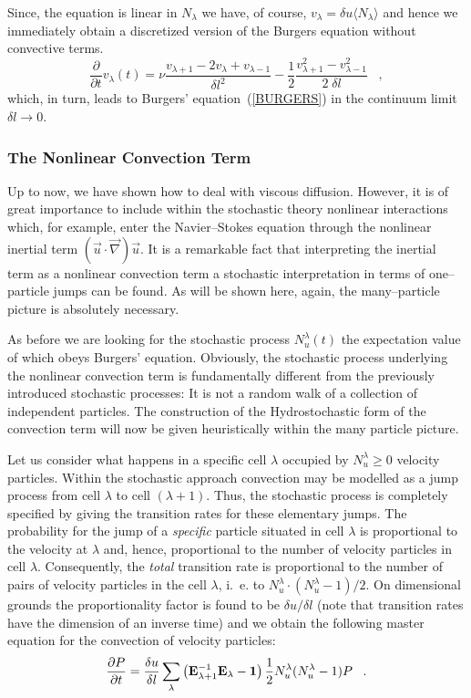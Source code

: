 Since, the equation is linear in $N_{\lambda}$ we have, of course,
$v_{\lambda} = \delta u \langle N_{\lambda} \rangle$ and hence
we immediately obtain a discretized version of the Burgers equation without
convective terms. 
\begin{equation}
\label{DISCRETEBURGERS}
\frac{\partial}{\partial t} v_{\lambda}(t) =
\nu \frac{v_{\lambda +1} -2 v_{\lambda} +
v_{\lambda -1}}{\delta l^2}
- \frac{1}{2} \frac{v_{\lambda+1}^2 -
v_{\lambda -1}^2}{2 \; \delta l }
\;\;\; ,
\end{equation}
which, in turn, leads to Burgers' equation~(\ref{BURGERS}) in the
continuum limit $\delta l \longrightarrow 0$.

\subsubsection{The Nonlinear Convection Term}
Up to now, we have shown how to deal with  viscous diffusion. 
However, it is of great importance
to include
within the stochastic theory nonlinear interactions which, for
example, enter
the Navier--Stokes equation through the nonlinear inertial term
$(\vec{u} \cdot \vec{\nabla}) \vec{u}$. It is a remarkable fact
that interpreting
the inertial term as a nonlinear convection term a
stochastic interpretation
in terms of one--particle jumps can be found. As will be shown
here, again,
the many--particle picture is absolutely necessary.

As before we are looking for the stochastic process
$N_u^{\lambda}(t)$
the expectation value of which obeys Burgers' equation. Obviously,
the
stochastic process underlying the
nonlinear convection term is fundamentally different from the
previously
introduced stochastic processes: It is not a random walk of
a collection
of independent particles.
The construction of the Hydrostochastic form of the
convection term will now be given heuristically
within the many particle picture.
 

Let us consider what happens in a specific cell $\lambda$ occupied
by
$N_u^{\lambda} \geq 0$ velocity particles. Within the stochastic
approach
convection may be modelled as a jump process from cell
$\lambda$ to cell $(\lambda + 1)$.
Thus, the stochastic process is
completely specified by giving the transition rates for
these elementary jumps. The probability for the jump of a
{\em{specific}} particle situated in cell $\lambda$ is proportional
to the velocity at $\lambda$ and, hence, proportional to the
number of velocity particles in cell $\lambda$.
Consequently, the
{\em total} transition rate is proportional to the number of pairs
of velocity particles in the cell $\lambda$, i.~e. to
$N_u^{\lambda} \cdot
(N_u^{\lambda} - 1) / 2$. On dimensional grounds the
proportionality factor
is found to be $\delta u / \delta l$ (note that transition rates
have
the dimension of an inverse time) and we obtain the following master
equation for the convection of velocity particles:
\begin{equation}
\frac{\partial P}{\partial t}  = 
\frac{\delta u}{\delta l} \sum_{\lambda}
     \left( {\bf E}_{\lambda +1}^{-1} {\bf E}_{\lambda} - {\bf 1}
    \right) \frac{1}{2} N_u^{\lambda} (N_u^{\lambda}-1) P
\;\;\; .
\end{equation}
 

